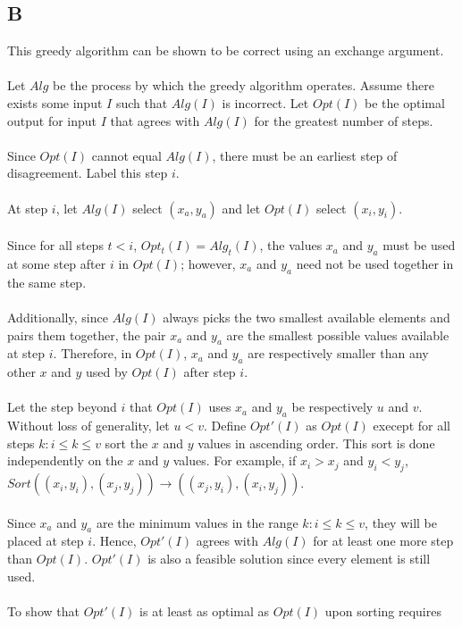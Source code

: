 \documentclass[12pt]{article}
\begin{document}
\subsection*{B}
This greedy algorithm can be shown to be correct using an
exchange argument.\\\\
Let $Alg$ be the process by which the greedy algorithm operates.
Assume there exists some input $I$ such that $Alg(I)$ is incorrect.
Let $Opt(I)$ be the optimal output for input $I$ that agrees with
$Alg(I)$ for the greatest number of steps.\\\\
Since $Opt(I)$ cannot equal $Alg(I)$, there must be an earliest
step of disagreement.  Label this step $i$.\\\\
At step $i$, let $Alg(I)$ select $(x_a, y_a)$ and let $Opt(I)$ select
$(x_i,y_i)$.\\\\
Since for all steps $t < i$, $Opt_t(I) = Alg_t(I)$, the values $x_a$ and
$y_a$ must be used at some step after $i$ in $Opt(I)$; however, $x_a$ and
$y_a$ need not be used together in the same step.\\\\
Additionally, since $Alg(I)$ always picks the two smallest available
elements and pairs them together, the pair $x_a$ and $y_a$ are the smallest
possible values available at step $i$.  Therefore, in $Opt(I)$, $x_a$ and
$y_a$ are respectively smaller than any other $x$ and $y$ used by $Opt(I)$
after step $i$.\\\\
Let the step beyond $i$ that $Opt(I)$ uses
$x_a$ and $y_a$ be respectively $u$ and $v$.  Without loss of generality,
let $u < v$.  Define $Opt'(I)$ as $Opt(I)$ execept for all steps $k: i \leq 
k \leq v$ sort the $x$ and $y$ values in ascending order.  This sort is done
independently on the $x$ and $y$ values.  For example, if $x_i > x_j$ and
$y_i < y_j$, $Sort((x_i,y_i),(x_j,y_j))\to((x_j,y_i),(x_i,y_j))$.\\\\
Since $x_a$ and $y_a$
are the minimum values in the range $k: i \leq k \leq v$, they will be placed
at step $i$.  Hence, $Opt'(I)$ agrees with $Alg(I)$ for at least one more
step than $Opt(I)$.  $Opt'(I)$ is also a feasible solution since every element
is still used.\\\\
To show that $Opt'(I)$ is at least as optimal as $Opt(I)$ upon sorting requires
\end{document}

